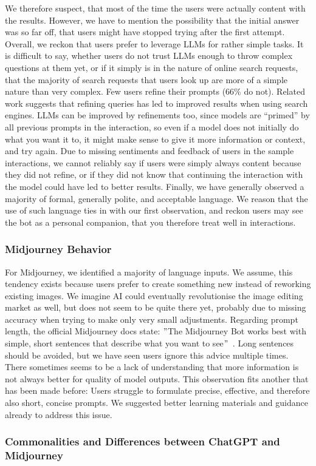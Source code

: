 We therefore suspect, that most of the time the users were actually content with the results.
However, we have to mention the possibility that the initial answer was so far off,
that users might have stopped trying after the first attempt.
Overall, we reckon that users prefer to leverage LLMs for rather simple tasks.
It is difficult to say, whether users do not trust LLMs enough to throw complex questions at
them yet, or if it simply is in the nature of online search requests, that the majority of search
requests that users look up are more of a simple nature than very complex.
Few users refine their prompts (66\% do not).
Related work suggests that refining queries has led to improved results when using search
engines.
LLMs can be improved by refinements too, since models are “primed” by all previous prompts in
the interaction, so even if a model does not initially do what you want it to, it might make
sense to give it more information or context, and try again.
Due to missing sentiments and feedback of users in the sample interactions, we cannot reliably say
if users were simply always content because they did not refine, or if they did not know that
continuing the interaction with the model could have led to better results.
Finally, we have generally observed a majority of formal, generally polite, and acceptable language.
We reason that the use of such language ties in with our first observation, and reckon users may see
the bot as a personal companion, that you therefore treat well in interactions.

\subsubsection{Midjourney Behavior}
For Midjourney, we identified a majority of language inputs.
We assume, this tendency exists because users prefer to create something new instead
of reworking existing images.
We imagine AI could eventually revolutionise the image editing market as well, but does not seem
to be quite there yet, probably due to missing accuracy when trying to make only very small
adjustments.
Regarding prompt length, the official Midjourney docs state: \("\)The Midjourney Bot works best with
simple, short sentences that describe what you want to see\("\)~\cite{midjourney_documentation_2023}.
Long sentences should be avoided, but we have seen users ignore this advice multiple times.
There sometimes seems to be a lack of understanding that more information is not
always better for quality of model outputs.
This observation fits another that has been made before:
Users struggle to formulate precise, effective, and therefore also short, concise prompts.
We suggested better learning materials and guidance already to address this issue.

\subsubsection{Commonalities and Differences between ChatGPT and Midjourney}
